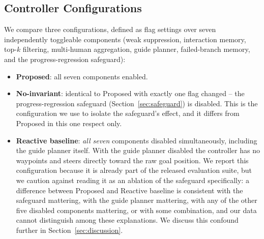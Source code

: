 \documentclass[conference,letterpaper,10pt]{ieeeconf}
\begin{document}
\subsection{Controller Configurations}
We compare three configurations, defined as flag settings over seven
independently toggleable components (weak suppression, interaction
memory, top-$k$ filtering, multi-human aggregation, guide planner,
failed-branch memory, and the progress-regression safeguard):

\begin{itemize}
  \item \textbf{Proposed}: all seven components enabled.
  \item \textbf{No-invariant}: identical to Proposed with exactly one flag
  changed -- the progress-regression safeguard (Section~\ref{sec:safeguard})
  is disabled. This is the configuration we use to isolate the safeguard's
  effect, and it differs from Proposed in this one respect only.
  \item \textbf{Reactive baseline}: \emph{all seven} components disabled
  simultaneously, including the guide planner itself. With the guide
  planner disabled the controller has no waypoints and steers directly
  toward the raw goal position. We report this configuration because it
  is already part of the released evaluation suite, but we caution against
  reading it as an ablation of the safeguard specifically: a difference
  between Proposed and Reactive baseline is consistent with the safeguard
  mattering, with the guide planner mattering, with any of the other five
  disabled components mattering, or with some combination, and our data
  cannot distinguish among these explanations. We discuss this confound
  further in Section~\ref{sec:discussion}.
\end{itemize}
\end{document}

